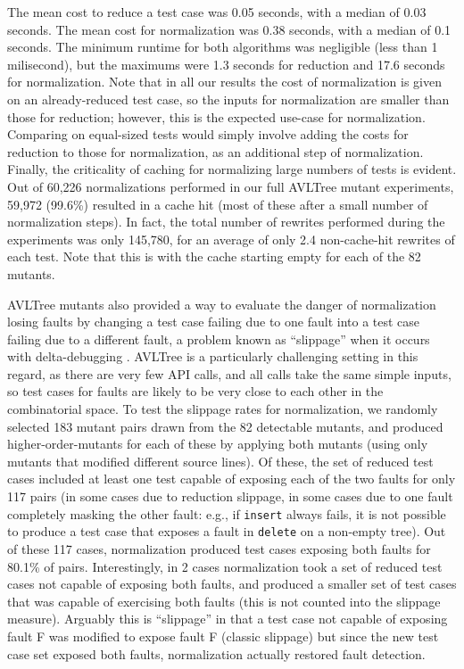 The mean cost to reduce a
test case was 0.05 seconds, with a median of 0.03 seconds.  The mean
cost for normalization was 0.38 seconds, with a median of 0.1 seconds.
The minimum runtime for both algorithms was negligible (less than 1
milisecond), but the maximums were 1.3 seconds for reduction and 17.6
seconds for normalization.  Note that in all our results the cost of
normalization is given on an already-reduced test case, so the inputs
for normalization are smaller than those for reduction; however, this
is the expected use-case for normalization.  Comparing on equal-sized
tests would simply involve adding the costs for reduction to those for
normalization, as an additional step of normalization.  Finally, the
criticality of caching for normalizing large numbers of tests is
evident.  Out of 60,226 normalizations performed in our full AVLTree mutant
experiments, 59,972 (99.6\%) resulted in a cache hit (most of these
after a small number of normalization steps).  In fact, the total
number of rewrites performed during the experiments was only 145,780,
for an average of only 2.4 non-cache-hit rewrites of each test.  Note
that this is with the cache starting empty for each of the 82 mutants.

AVLTree mutants also provided a way to evaluate the danger of
normalization losing faults by changing a test case failing due to one
fault into a test case failing due to a different fault, a problem
known as ``slippage'' when it occurs with delta-debugging
\cite{PLDI13}.  AVLTree is a particularly challenging setting in this
regard, as there are very few API calls, and all calls take the same
simple inputs, so test cases for faults are likely to be very close to
each other in the combinatorial space.  To test the slippage rates for
normalization, we randomly selected 183 mutant pairs drawn from the 82
detectable mutants, and produced higher-order-mutants for each of
these by applying both mutants (using only mutants that modified
different source lines).  Of these, the set of reduced test cases
included at least one test capable of exposing each of the two faults
for only 117 pairs (in some cases due to reduction slippage, in some
cases due to one fault completely masking the other fault:  e.g., if
{\tt insert} always fails, it is not possible to produce a test case
that exposes a fault in {\tt delete} on a non-empty tree).  Out of
these 117 cases, normalization produced test cases exposing both faults
for 80.1\% of pairs.  Interestingly, in 2 cases normalization took
a set of reduced test cases not capable of exposing both faults, and
produced a smaller set of test cases that was capable of exercising
both faults (this is not counted into the slippage measure).
Arguably this is ``slippage'' in that a test case not capable of
exposing fault F was modified to expose fault F (classic slippage) but
since the new test case set exposed both faults, normalization
actually restored fault detection.

